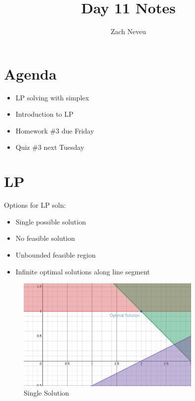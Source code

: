 \documentclass[12pt, letter]{article}
\author{Zach Neveu}
\title{ Day 11 Notes }
\begin{document}
\maketitle

\section{Agenda}%
\label{sec:agenda}
\begin{itemize}
	\item LP solving with simplex
	\item Introduction to LP
	\item Homework \#3 due Friday
	\item Quiz \#3 next Tuesday
\end{itemize}

\section{LP}%
\label{sec:lp}
Options for LP soln: \\
\begin{itemize}
	\item Single possible solution
	\item No feasible solution
	\item Unbounded feasible region
	\item Infinite optimal solutions along line segment
\end{itemize}

\begin{figure}[h]
	\centering
	\includegraphics[width=0.8\textwidth]{single-soln}
	\caption{Single Solution}
	\label{fig:single-soln}
\end{figure}
\end{document}
